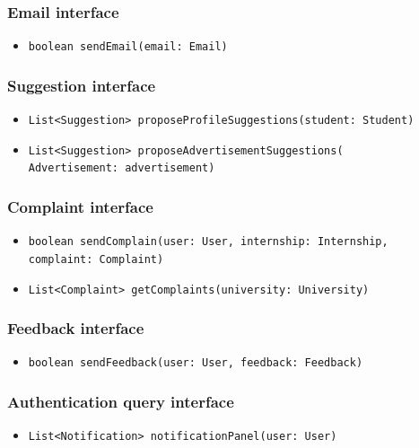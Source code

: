 \subsubsection{Email interface}
\begin{itemize}
    \item \verb|boolean sendEmail(email: Email)|
\end{itemize}

\subsubsection{Suggestion interface}
\begin{itemize}
    \item \verb|List<Suggestion> proposeProfileSuggestions(student: Student)|
    \item \verb|List<Suggestion> proposeAdvertisementSuggestions(| \\ \makebox[10em][l]{} \verb|Advertisement: advertisement)|
\end{itemize}

\subsubsection{Complaint interface}
\begin{itemize}
    \item \verb|boolean sendComplain(user: User, internship: Internship, | \\ \makebox[10em][l]{} \verb|complaint: Complaint)|
    \item \verb|List<Complaint> getComplaints(university: University)|
\end{itemize}

\subsubsection{Feedback interface}
\begin{itemize}
    \item \verb|boolean sendFeedback(user: User, feedback: Feedback)|
\end{itemize}

\subsubsection{Authentication query interface}
\begin{itemize}
    \item \verb|List<Notification> notificationPanel(user: User)|
\end{itemize}

